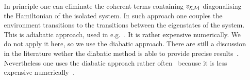 \documentclass[12pt,twoside,a4paper]{report}
\begin{document}
In principle one can eliminate the coherent terms containing $
v_{\cal{K} \cal{M}}$ diagonalising the Hamiltonian of the isolated
system.  In such approach one couples the environment transitions to
the transitions between the eigenstates of the system. This is
adiabatic approach, used in e.g.~\cite{p3}.
It is rather expensive numerically. 
We do not apply it here, so we use the diabatic approach.
There are still a discussion in the literature 
wether the diabatic method is able to provide 
precise results~\cite{mura95}.
Nevertheless one uses the diabatic approach rather often~\cite{may92,kueh94}
because it is less expensive numerically~\cite{domc99}.
\end{document}

